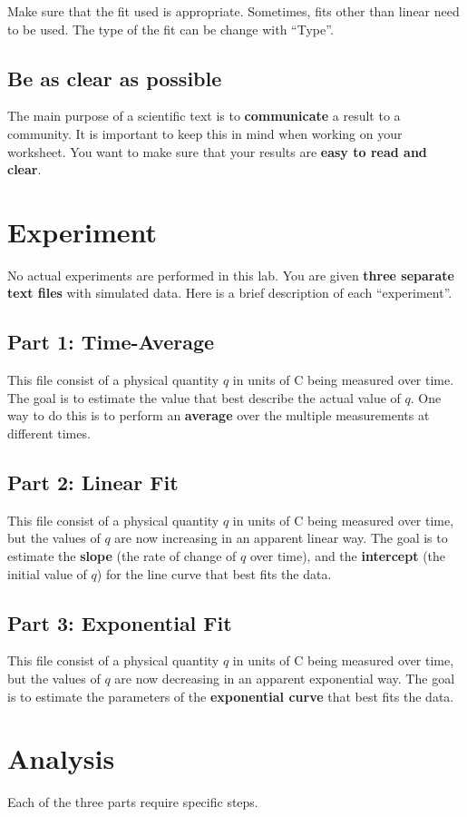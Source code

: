 Make sure that the fit used is appropriate. Sometimes, fits other than linear need to be used. The type of the fit can be change with ``Type''.
%
\subsection{Be as clear as possible}
%
The main purpose of a scientific text is to \textbf{communicate} a result to a community. It is important to keep this in mind when working on your worksheet. You want to make sure that your results are \textbf{easy to read and clear}.
%
\section{Experiment}
%
No actual experiments are performed in this lab. You are given \textbf{three separate text files} with simulated data. Here is a brief description of each ``experiment''.
%
\subsection{Part 1: Time-Average}
%
This file consist of a physical quantity $q$ in units of C being measured over time. The goal is to estimate the value that best describe the actual value of $q$. One way to do this is to perform an \textbf{average} over the multiple measurements at different times.
%
\subsection{Part 2: Linear Fit}
%
This file consist of a physical quantity $q$ in units of C being measured over time, but the values of $q$ are now increasing in an apparent linear way. The goal is to estimate the \textbf{slope} (the rate of change of $q$ over time), and the \textbf{intercept} (the initial value of $q$) for the line curve that best fits the data.
%
\subsection{Part 3: Exponential Fit}
%
This file consist of a physical quantity $q$ in units of C being measured over time, but the values of $q$ are now decreasing in an apparent exponential way. The goal is to estimate the parameters of the \textbf{exponential curve} that best fits the data.
%
\section{Analysis}
%
Each of the three parts require specific steps.
%
